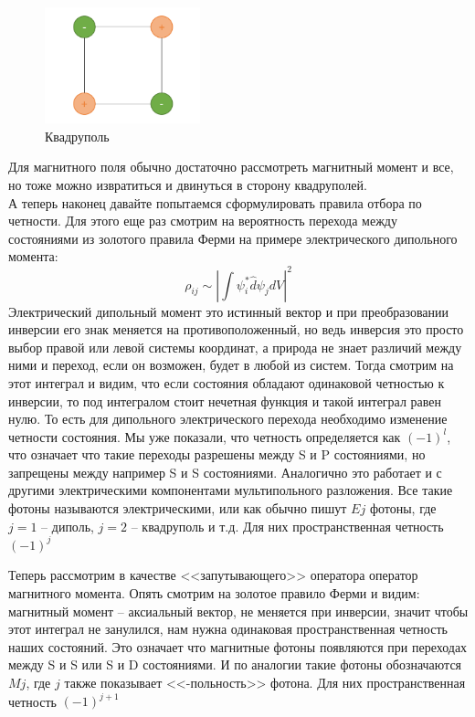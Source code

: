 \documentclass[12pt]{article}
\begin{document}
\begin{figure}[h]
    \centering
    \includegraphics[width=0.4\textwidth,height=\textheight,keepaspectratio]{Seminar_08/pics/pic_02.pdf}
    \caption{Квадруполь}
    \label{fig:sem_08_quad}
\end{figure}
Для магнитного поля обычно достаточно рассмотреть магнитный момент и все, но тоже можно извратиться и двинуться в сторону квадруполей.\\
А теперь наконец давайте попытаемся сформулировать правила отбора по четности. Для этого еще раз смотрим на вероятность перехода между состояниями из золотого правила Ферми на примере электрического дипольного момента:
\begin{equation*}
    \rho_{ij} \sim \left| \int \psi^*_i\hat{d}\psi_j dV\right|^2
\end{equation*}
Электрический дипольный момент это истинный вектор и при преобразовании инверсии его знак меняется на противоположенный, но ведь инверсия это просто выбор правой или левой системы координат, а природа не знает различий между ними и переход, если он возможен, будет в любой из систем. Тогда смотрим на этот интеграл и видим, что если состояния обладают одинаковой четностью к инверсии, то под интегралом стоит нечетная функция и такой интеграл равен нулю. То есть для дипольного электрического перехода необходимо изменение четности состояния. Мы уже показали, что четность определяется как $(-1)^l$, что означает что такие переходы разрешены между S и P состояниями, но запрещены между например S и S состояниями. Аналогично это работает и с другими электрическими компонентами мультипольного разложения. Все такие фотоны называются электрическими, или как обычно пишут $Ej$ фотоны, где $j=1$ -- диполь, $j=2$ -- квадруполь и т.д. Для них пространственная четность $(-1)^j$

Теперь рассмотрим в качестве <<запутывающего>> оператора оператор магнитного момента. Опять смотрим на золотое правило Ферми и видим: магнитный момент -- аксиальный вектор, не меняется при инверсии, значит чтобы этот интеграл не занулился, нам нужна одинаковая пространственная четность наших состояний. Это означает что магнитные фотоны появляются при переходах между S и S или S и D состояниями. И по аналогии такие фотоны обозначаются $Mj$, где $j$ также показывает <<-польность>> фотона. Для них пространственная четность $(-1)^{j+1}$
\end{document}
